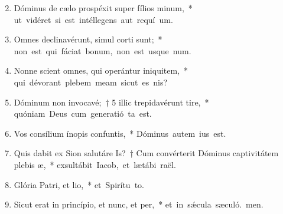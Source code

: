 \begin{flushleft}
\begin{enumerate}[leftmargin=*]
\setcounter{enumi}{1}


\item Dóminus de cælo prospéxit super fílios minum,~* \mbox{ut vidéret si est intéllegens aut requí um.}

\item Omnes declinavérunt, simul corti sunt;~* \mbox{non est qui fáciat bonum, non est usque  num.}

\item Nonne scient omnes, qui operántur iniquitem,~* \mbox{qui dévorant plebem meam sicut es nis?}

\item Dóminum non invocavé;~† 5 illic trepidavérunt tire,~* \mbox{quóniam Deus cum generatió ta est.}

\item Vos consílium ínopis confuntis,~* \mbox{Dóminus autem  ius est.}

\item Quis dabit ex Sion salutáre Is?~† Cum convérterit Dóminus captivitátem plebis æ,~* \mbox{exsultábit Iacob, et lætábi raël.}

\item Glória Patri, et lio,~* \mbox{et Spirítu to.}

\item Sicut erat in princípio, et nunc, et per,~* \mbox{et in s\'{\ae}cula sæculó. men.}

\end{enumerate}
\end{flushleft}

